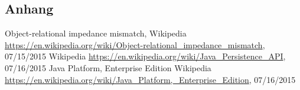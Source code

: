 \subsection*{Anhang}\label{anhang}

%
%
\begin{thebibliography}{99}
	Object-relational impedance mismatch,
	Wikipedia
	\url{https://en.wikipedia.org/wiki/Object-relational_impedance_mismatch}, 07/15/2015
	Wikipedia
	\url{https://en.wikipedia.org/wiki/Java_Persistence_API}, 07/16/2015
	Java Platform, Enterprise Edition
	Wikipedia
	\url{https://en.wikipedia.org/wiki/Java_Platform,_Enterprise_Edition}, 07/16/2015
	
	
	
\end{thebibliography}
